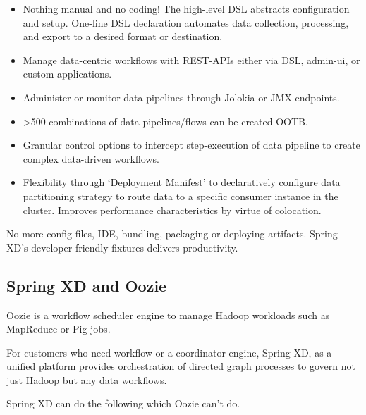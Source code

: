 \begin{itemize}
\item Nothing manual and no coding! The high-level DSL abstracts configuration and setup. One-line DSL declaration automates data collection, processing, and export to a desired format or destination.
\item Manage data-centric workflows with REST-APIs either via DSL, admin-ui, or custom applications.
\item Administer or monitor data pipelines through Jolokia or JMX endpoints. 
\item >500 combinations of data pipelines/flows can be created OOTB.
\item Granular control options to intercept step-execution of data pipeline to create complex data-driven workflows.
\item Flexibility through ‘Deployment Manifest’ to declaratively configure data partitioning strategy to route data to a specific consumer instance in the cluster. Improves performance characteristics by virtue of colocation.
\end{itemize}

No more config files, IDE, bundling, packaging or deploying artifacts. Spring XD’s developer-friendly fixtures delivers productivity. 

\subsection{Spring XD and Oozie}
Oozie is a workflow scheduler engine to manage Hadoop workloads such as MapReduce or Pig jobs. 

For customers who need workflow or a coordinator engine, Spring XD, as a unified platform provides orchestration of directed graph processes to govern not just Hadoop but any data workflows. 

Spring XD can do the following which Oozie can't do.


